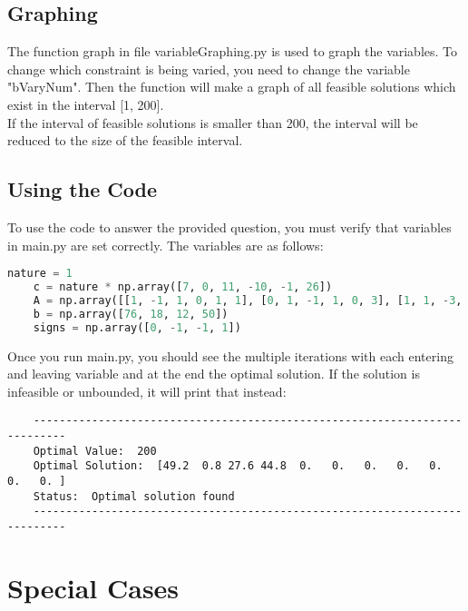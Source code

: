 \documentclass{article}
\numberwithin{equation}{section}
\begin{document}
\subsection{Graphing}
The function graph in file variableGraphing.py is used to graph the variables. To change which constraint is being varied, you need to change the variable "bVaryNum". Then the function will make a graph of all feasible solutions which exist in the interval [1, 200].\\
If the interval of feasible solutions is smaller than 200, the interval will be reduced to the size of the feasible interval.
\subsection{Using the Code}
To use the code to answer the provided question, you must verify that variables in main.py are set correctly. The variables are as follows:
\begin{lstlisting}[language=Python, basicstyle=\scriptsize, frame=single]
    nature = 1
    c = nature * np.array([7, 0, 11, -10, -1, 26])
    A = np.array([[1, -1, 1, 0, 1, 1], [0, 1, -1, 1, 0, 3], [1, 1, -3, 1, 1, 0], [1, 1, 0, 0, 0, 1]])
    b = np.array([76, 18, 12, 50])
    signs = np.array([0, -1, -1, 1])
\end{lstlisting}
Once you run main.py, you should see the multiple iterations with each entering and leaving variable and at the end the optimal solution. If the solution is infeasible or unbounded, it will print that instead:
\begin{lstlisting}
    ---------------------------------------------------------------------------
    Optimal Value:  200
    Optimal Solution:  [49.2  0.8 27.6 44.8  0.   0.   0.   0.   0.   0.   0. ]
    Status:  Optimal solution found
    ---------------------------------------------------------------------------
\end{lstlisting}

\newpage
\section{Special Cases}

\newpage
\end{document}
